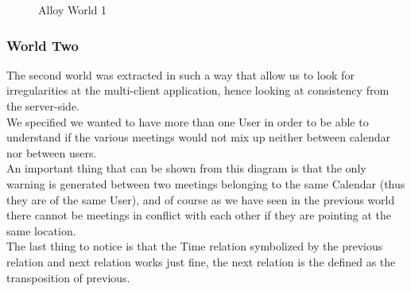 \begin{figure} 

\begin{center}

\caption{Alloy World 1} 
\label{fig:alloyworld1} 


\end{center}
\end{figure} 

\clearpage
\subsubsection{World Two}

The second world was extracted in such a way that allow us to look for irregularities at the multi-client application, hence looking at consistency from the server-side.
\\We specified we wanted to have more than one User in order to be able to understand if the various meetings would not mix up neither between calendar nor between users.
\\An important thing that can be shown from this diagram is that the only warning is generated between two meetings belonging to the same Calendar (thus they are of the same User), and of course as we have seen in the previous world there cannot be meetings in conflict with each other if they are pointing at the same location.
\\The last thing to notice is that the Time relation symbolized by the previous relation and next relation works just fine, the next relation is the defined as the transposition of previous.


